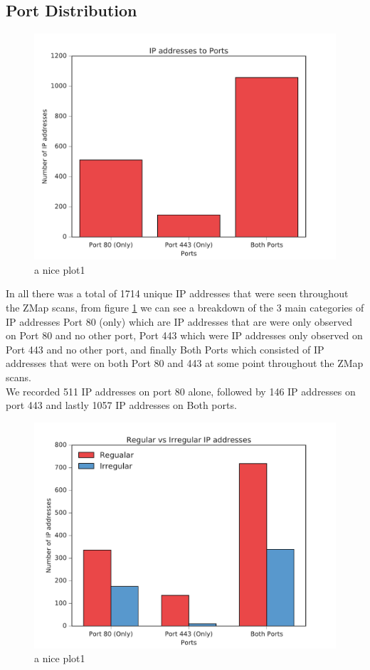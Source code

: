 \documentclass[a4wide,leqno,12pt]{report}
\begin{document}
\subsection{Port Distribution}
\begin{figure}[H]
\centering
\includegraphics[scale=.5]{pdf_images/IPaddressestoPorts}
\caption{a nice plot1}
\label{fig:ports}
\end{figure}
In all there was a total of 1714 unique IP addresses that were seen throughout the ZMap scans, from figure \ref{fig:ports} we can see a breakdown of the 3 main categories of IP addresses Port 80 (only) which are IP addresses that are were only observed on Port 80 and no other port, Port 443 which were IP addresses only observed on Port 443 and no other port, and finally Both Ports which consisted of IP addresses that were on both Port 80 and 443 at some point throughout the ZMap scans.\\

We recorded 511 IP addresses on port 80 alone, followed by 146 IP addresses on port 443 and lastly 1057 IP addresses on Both ports.

\begin{figure}[H]
\centering
\includegraphics[scale=.5]{pdf_images/RegularVsIrregularIPaddresses}
\caption{a nice plot1}
\label{fig:portsIrreg}
\end{figure}
\end{document}
